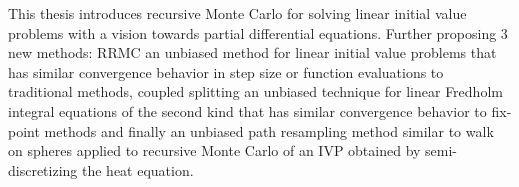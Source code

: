 This thesis introduces recursive Monte Carlo
for solving linear initial value problems with a vision towards
partial differential equations.
Further proposing $3$ new methods:
RRMC an unbiased method for linear initial value problems
that has similar convergence behavior in step size or function evaluations to traditional methods,
coupled splitting an unbiased technique for linear Fredholm integral equations of the
second kind that has similar convergence behavior to fix-point methods
and finally an unbiased path resampling method similar to walk on spheres applied
to recursive Monte Carlo of an IVP obtained by semi-discretizing the heat equation.